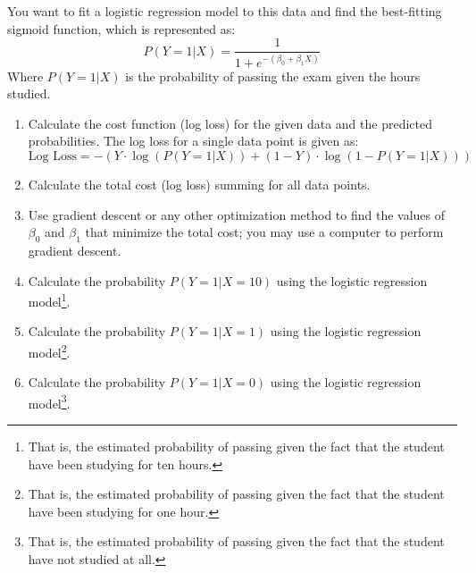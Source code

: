 \documentclass[]{article}
\begin{document}
	You want to fit a logistic regression model to this data and find the best-fitting sigmoid function, which is represented as:
	$$P(Y=1|X) = \frac{1}{1 + e^{-(\beta_0 + \beta_1X)}}$$
	Where $P(Y=1|X)$ is the probability of passing the exam given the hours studied.
	
	\begin{enumerate}
		\item Calculate the cost function (log loss) for the given data and the predicted probabilities. The log loss for a single data point is given as:
		$$\text{Log Loss} = -\left(Y \cdot \log(P(Y=1|X)) + (1 - Y) \cdot \log(1 - P(Y=1|X))\right)$$
		\item Calculate the total cost (log loss) summing for all data points.
		\item Use gradient descent or any other optimization method to find the values of $\beta_0$ and $\beta_1$ that minimize the total cost; you may use a computer to perform gradient descent.
		\item Calculate the probability $P(Y=1|X=10)$ using the logistic regression model\footnote{That is, the estimated probability of passing given the fact that the student have been studying for ten hours.}.
		\item Calculate the probability $P(Y=1|X=1)$ using the logistic regression model\footnote{That is, the estimated probability of passing given the fact that the student have been studying for one hour.}.
		\item Calculate the probability $P(Y=1|X=0)$ using the logistic regression model\footnote{That is, the estimated probability of passing given the fact that the student have not studied at all.}.
	\end{enumerate}
	
	
\end{document}
